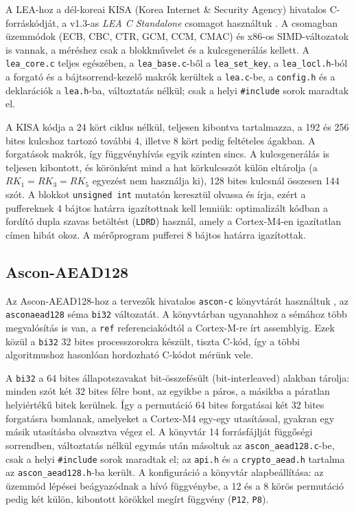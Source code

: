 \documentclass[a4paper,12pt]{report}
\theoremstyle{definition}
\theoremstyle{remark}
\begin{document}
A LEA-hoz a dél-koreai KISA (Korea Internet \& Security Agency) hivatalos C-forráskódját, a v1.3-as \emph{LEA C Standalone} csomagot használtuk \cite{KISALEAsrc}. A csomagban üzemmódok (ECB, CBC, CTR, GCM, CCM, CMAC) és x86-os SIMD-változatok is vannak, a méréshez csak a blokkművelet és a kulcsgenerálás kellett. A \texttt{lea\_core.c} teljes egészében, a \texttt{lea\_base.c}-ből a \texttt{lea\_set\_key}, a \texttt{lea\_locl.h}-ból a forgató és a bájtsorrend-kezelő makrók kerültek a \texttt{lea.c}-be, a \texttt{config.h} és a deklarációk a \texttt{lea.h}-ba, változtatás nélkül; csak a helyi \texttt{\#include} sorok maradtak el.

A KISA kódja a 24 kört ciklus nélkül, teljesen kibontva tartalmazza, a 192 és 256 bites kulcshoz tartozó további 4, illetve 8 kört pedig feltételes ágakban. A forgatások makrók, így függvényhívás egyik szinten sincs. A kulcsgenerálás is teljesen kibontott, és körönként mind a hat körkulcsszót külön eltárolja (a $RK_1 = RK_3 = RK_5$ egyezést nem használja ki), 128 bites kulcsnál összesen 144 szót. A blokkot \texttt{unsigned int} mutatón keresztül olvassa és írja, ezért a puffereknek 4 bájtos határra igazítottnak kell lenniük: optimalizált kódban a fordító dupla szavas betöltést (\texttt{LDRD}) használ, amely a Cortex-M4-en igazítatlan címen hibát okoz. A mérőprogram pufferei 8 bájtos határra igazítottak.

\subsection{Ascon-AEAD128}

Az Ascon-AEAD128-hoz a tervezők hivatalos \texttt{ascon-c} könyvtárát használtuk \cite{AsconC}, az \texttt{asconaead128} séma \texttt{bi32} változatát. A könyvtárban ugyanahhoz a sémához több megvalósítás is van, a \texttt{ref} referenciakódtól a Cortex-M-re írt assemblyig. Ezek közül a \texttt{bi32} 32 bites processzorokra készült, tiszta C-kód, így a többi algoritmushoz hasonlóan hordozható C-kódot mérünk vele.

A \texttt{bi32} a 64 bites állapotszavakat bit-összefésült (bit-interleaved) alakban tárolja: minden szót két 32 bites félre bont, az egyikbe a páros, a másikba a páratlan helyiértékű bitek kerülnek. Így a permutáció 64 bites forgatásai két 32 bites forgatásra bomlanak, amelyeket a Cortex-M4 egy-egy utasítással, gyakran egy másik utasításba olvasztva végez el. A könyvtár 14 forrásfájlját függőségi sorrendben, változtatás nélkül egymás után másoltuk az \texttt{ascon\_aead128.c}-be, csak a helyi \texttt{\#include} sorok maradtak el; az \texttt{api.h} és a \texttt{crypto\_aead.h} tartalma az \texttt{ascon\_aead128.h}-ba került. A konfiguráció a könyvtár alapbeállítása: az üzemmód lépései beágyazódnak a hívó függvénybe, a 12 és a 8 körös permutáció pedig két külön, kibontott körökkel megírt függvény (\texttt{P12}, \texttt{P8}).
\end{document}
